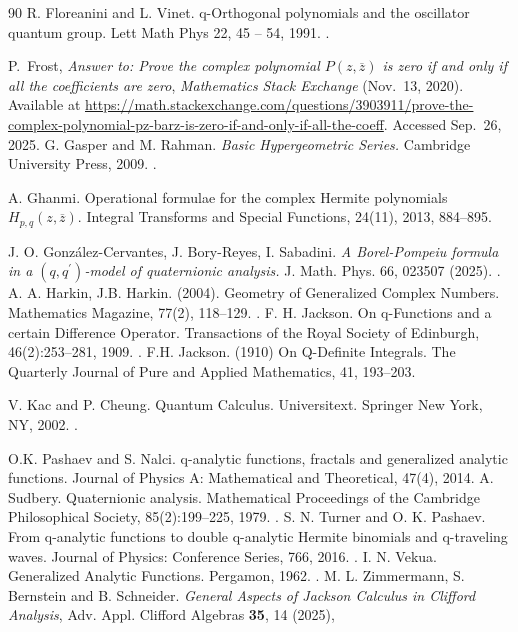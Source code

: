 \documentclass[10pt]{amsart}
\theoremstyle{plain}
\theoremstyle{definition}
\renewcommand{\bar}[1]{\overline{#1}}
\begin{document}
\begin{thebibliography}{90}
 R. Floreanini and L. Vinet. q-Orthogonal polynomials and the oscillator quantum group. Lett Math Phys 22, 45 -- 54, 1991. .

P.~Frost, \emph{Answer to: Prove the complex polynomial $P(z,\bar z)$ is zero if and only if all the coefficients are zero}, 
\textit{Mathematics Stack Exchange} (Nov.~13, 2020). 
Available at \url{https://math.stackexchange.com/questions/3903911/prove-the-complex-polynomial-pz-barz-is-zero-if-and-only-if-all-the-coeff}. 
Accessed Sep.~26, 2025.
 G. Gasper and M. Rahman. \textit{Basic Hypergeometric Series.} Cambridge University Press, 2009. .

A. Ghanmi. Operational formulae for the complex Hermite polynomials $H_{p,q}(z, \bar z)$. Integral Transforms and Special Functions, 24(11), 2013, 884--895. 

J. O. Gonz{\'a}lez-Cervantes, J. Bory-Reyes, I. Sabadini. \textit{A Borel-Pompeiu formula in a $(q,q^\prime)$-model of quaternionic analysis.} J. Math. Phys. 66, 023507 (2025). .
A. A. Harkin, J.B. Harkin. (2004). Geometry of Generalized Complex Numbers. Mathematics Magazine, 77(2), 118--129. .
 F. H. Jackson. On q-Functions and a certain Difference Operator. Transactions of the Royal Society of Edinburgh, 46(2):253--281, 1909. .
F.H. Jackson. (1910) On Q-Definite Integrals. The Quarterly Journal of Pure and Applied Mathematics, 41, 193--203.

 V. Kac and P. Cheung. Quantum Calculus. Universitext. Springer New York,
NY, 2002. .


 O.K. Pashaev and  S. Nalci. {q-analytic functions, fractals and generalized analytic functions}. Journal of Physics A: Mathematical and Theoretical, 47(4), 2014. 
 A. Sudbery. Quaternionic analysis. Mathematical Proceedings of the Cambridge Philosophical Society, 85(2):199--225, 1979. .
 S. N. Turner and O. K. Pashaev. From q-analytic functions to double q-analytic Hermite binomials and q-traveling waves. Journal of Physics: Conference Series,
766, 2016. .
 I. N. Vekua. Generalized Analytic Functions. Pergamon, 1962. .
	 M. L. Zimmermann, S. Bernstein and B. Schneider. \textit{General Aspects of Jackson Calculus in Clifford Analysis}, Adv. Appl. Clifford Algebras \textbf{35}, 14 (2025),  
\end{thebibliography}
\end{document}
